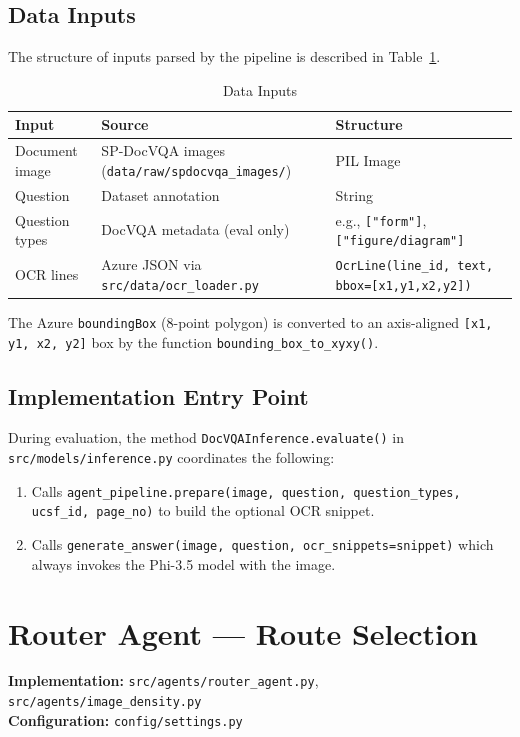 \documentclass[11pt,a4paper]{article}
\begin{document}
\subsection{Data Inputs}
The structure of inputs parsed by the pipeline is described in Table~\ref{tab:data_inputs}.

\begin{table}[H]
\centering
\caption{Data Inputs}
\label{tab:data_inputs}
\begin{tabular}{|p{3cm}|p{6cm}|p{6cm}|}
\hline
\textbf{Input} & \textbf{Source} & \textbf{Structure} \\ \hline
Document image & SP-DocVQA images (\texttt{data/raw/spdocvqa\_images/}) & PIL Image \\ \hline
Question & Dataset annotation & String \\ \hline
Question types & DocVQA metadata (eval only) & e.g., \texttt{["form"]}, \texttt{["figure/diagram"]} \\ \hline
OCR lines & Azure JSON via \texttt{src/data/ocr\_loader.py} & \texttt{OcrLine(line\_id, text, bbox=[x1,y1,x2,y2])} \\ \hline
\end{tabular}
\end{table}

The Azure \texttt{boundingBox} (8-point polygon) is converted to an axis-aligned \texttt{[x1, y1, x2, y2]} box by the function \texttt{bounding\_box\_to\_xyxy()}.

\subsection{Implementation Entry Point}
During evaluation, the method \texttt{DocVQAInference.evaluate()} in \texttt{src/models/inference.py} coordinates the following:
\begin{enumerate}
    \item Calls \texttt{agent\_pipeline.prepare(image, question, question\_types, ucsf\_id, page\_no)} to build the optional OCR snippet.
    \item Calls \texttt{generate\_answer(image, question, ocr\_snippets=snippet)} which always invokes the Phi-3.5 model with the image.
\end{enumerate}

\newpage
\section{Router Agent --- Route Selection}
\textbf{Implementation:} \texttt{src/agents/router\_agent.py}, \texttt{src/agents/image\_density.py} \\
\textbf{Configuration:} \texttt{config/settings.py}
\end{document}
